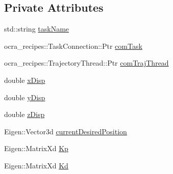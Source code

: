 \subsection*{\-Private \-Attributes}
\begin{DoxyCompactItemize}
\item 
std\-::string \hyperlink{classSittingDemoClient_a305448a4a64c8ff7ae1095a33049a23f}{task\-Name}
\item 
ocra\-\_\-recipes\-::\-Task\-Connection\-::\-Ptr \hyperlink{classSittingDemoClient_aa843c7358b6c9525d4d0cd6f3db27878}{com\-Task}
\item 
ocra\-\_\-recipes\-::\-Trajectory\-Thread\-::\-Ptr \hyperlink{classSittingDemoClient_a91f2f57bfaeb3a43247836823401b71d}{com\-Traj\-Thread}
\item 
double \hyperlink{classSittingDemoClient_ad3056b59c1c427cff70713799dda7734}{x\-Disp}
\item 
double \hyperlink{classSittingDemoClient_aa1a0d99f0413afe5e306eb066d3102f6}{y\-Disp}
\item 
double \hyperlink{classSittingDemoClient_a9d9147b68eb482079b9ebdd24eadc3a2}{z\-Disp}
\item 
\-Eigen\-::\-Vector3d \hyperlink{classSittingDemoClient_a026778b7ccf56bc9674ef84f8700f66e}{current\-Desired\-Position}
\item 
\-Eigen\-::\-Matrix\-Xd \hyperlink{classSittingDemoClient_a02111e627bb202646b99c5d1643cf42b}{\-Kp}
\item 
\-Eigen\-::\-Matrix\-Xd \hyperlink{classSittingDemoClient_a66a12899f7f64dbfa1c1dc5dc641a1b0}{\-Kd}
\end{DoxyCompactItemize}


